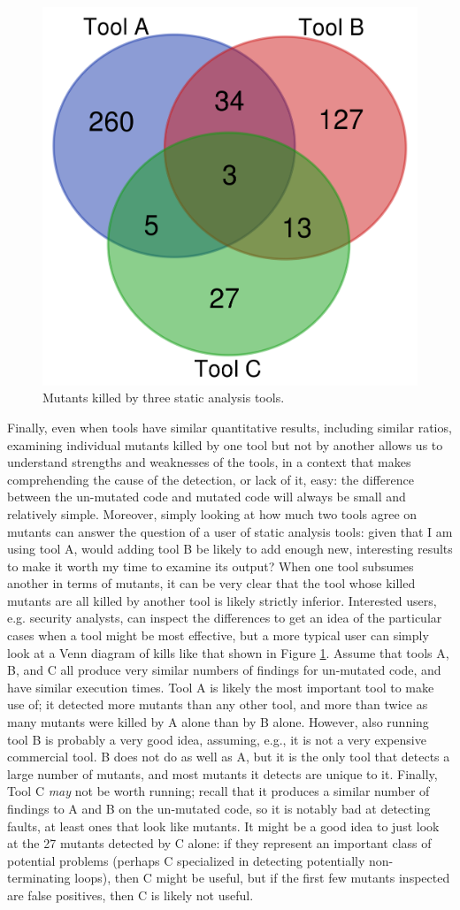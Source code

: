 \begin{figure}
  \includegraphics[width=0.5\columnwidth]{example.png}
  \caption{Mutants killed by three static analysis tools.}
  \label{fig:examplevenn}
\end{figure}

Finally, even when tools have similar quantitative results, including similar ratios, examining individual mutants killed by one tool but not by another allows us to understand strengths and weaknesses of the tools, in a context that makes comprehending the cause of the detection, or lack of it, easy: the difference between the un-mutated code and mutated code will always be small and relatively simple.  Moreover, simply looking at how much two tools agree on mutants can answer the question of a user of static analysis tools: given that I am using tool A, would adding tool B be likely to add enough new, interesting results to make it worth my time to examine its output?  When one tool subsumes another in terms of mutants, it can be very clear that the tool whose killed mutants are all killed by another tool is likely strictly inferior.  Interested users, e.g. security analysts, can inspect the differences to get an idea of the particular cases when a tool might be most effective, but a more typical user can simply look at a Venn diagram of kills like that shown in Figure \ref{fig:examplevenn}.  Assume that tools A, B, and C all produce very similar numbers of findings for un-mutated code, and have similar execution times.  Tool A is likely the most important tool to make use of; it detected more mutants than any other tool, and more than twice as many mutants were killed by A alone than by B alone.  However, also running tool B is probably a very good idea, assuming, e.g., it is not a very expensive commercial tool.  B does not do as well as A, but it is the only tool that detects a large number of mutants, and most mutants it detects are unique to it.  Finally, Tool C \emph{may} not be worth running; recall that it produces a similar number of findings to A and B on the un-mutated code, so it is notably bad at detecting faults, at least ones that look like mutants.  It might be a good idea to just look at the 27 mutants detected by C alone:  if they represent an important class of potential problems (perhaps C specialized in detecting potentially non-terminating loops), then C might be useful, but if the first few mutants inspected are false positives, then C is likely not useful.

